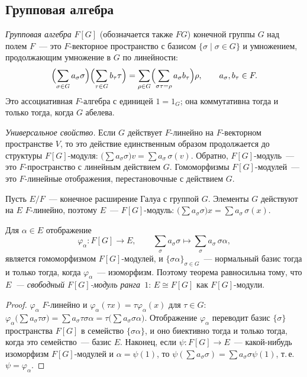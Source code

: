 \subsection*{Групповая алгебра}

\emph{Групповая алгебра} $F[G]$ (обозначается также $FG$) конечной группы $G$ над полем $F$~--- это $F$-векторное
пространство с базисом $\{\sigma\mid\sigma\in G\}$ и умножением, продолжающим умножение в $G$ по линейности:
\[
\Bigl(\sum_{\sigma\in G}a_\sigma\sigma\Bigr)\Bigl(\sum_{\tau\in G}b_\tau\tau\Bigr)
=\sum_{\rho\in G}\Bigl(\sum_{\sigma\tau=\rho}a_\sigma b_\tau\Bigr)\rho,\qquad a_\sigma,b_\tau\in F.
\]
Это ассоциативная $F$-алгебра с единицей $1=1_G$; она коммутативна тогда и только тогда, когда $G$ абелева.

\emph{Универсальное свойство.} Если $G$ действует $F$-линейно на $F$-векторном пространстве $V$, то это действие
единственным образом продолжается до структуры $F[G]$-модуля: $\bigl(\sum a_\sigma\sigma\bigr)v=\sum a_\sigma\,\sigma(v)$.
Обратно, $F[G]$-модуль~--- это $F$-пространство с линейным действием $G$. Гомоморфизмы $F[G]$-модулей~--- это
$F$-линейные отображения, перестановочные с действием $G$.

Пусть $E/F$~--- конечное расширение Галуа с группой $G$. Элементы $G$ действуют на $E$ $F$-линейно, поэтому $E$~---
$F[G]$-модуль: $\bigl(\sum a_\sigma\sigma\bigr)x=\sum a_\sigma\,\sigma(x)$.

\begin{proposition}[5.18a]
Для $\alpha\in E$ отображение
\[
\varphi_\alpha\colon F[G]\to E,\qquad \sum_\sigma a_\sigma\sigma\mapsto\sum_\sigma a_\sigma\,\sigma\alpha,
\]
является гомоморфизмом $F[G]$-модулей, и $\{\sigma\alpha\}_{\sigma\in G}$~--- нормальный базис тогда и только тогда, когда
$\varphi_\alpha$~--- изоморфизм. Поэтому теорема  равносильна тому, что \emph{$E$~--- свободный $F[G]$-модуль
ранга~$1$}: $E\cong F[G]$ как $F[G]$-модули.
\end{proposition}

\begin{proof}
$\varphi_\alpha$ $F$-линейно и $\varphi_\alpha(\tau x)=\tau\varphi_\alpha(x)$ для $\tau\in G$:
$\varphi_\alpha\bigl(\sum a_\sigma\tau\sigma\bigr)=\sum a_\sigma\tau\sigma\alpha=\tau\bigl(\sum a_\sigma\sigma\alpha\bigr)$.
Отображение $\varphi_\alpha$ переводит базис $\{\sigma\}$ пространства $F[G]$ в семейство $\{\sigma\alpha\}$, и оно биективно
тогда и только тогда, когда это семейство~--- базис $E$. Наконец, если $\psi\colon F[G]\to E$~--- какой-нибудь изоморфизм
$F[G]$-модулей и $\alpha=\psi(1)$, то $\psi(\sum a_\sigma\sigma)=\sum a_\sigma\sigma\psi(1)$, т.\,е.\ $\psi=\varphi_\alpha$.
\end{proof}

